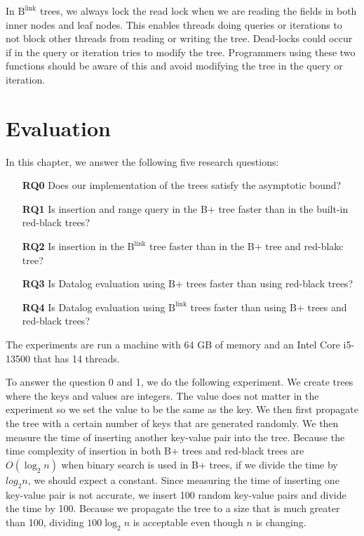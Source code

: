 \documentclass[twoside,11pt]{report}
\theoremstyle{definition}
\begin{document}
In $\text{B}^{\text{link}}$ trees, we always lock the read lock when we are reading the fields in both inner nodes and leaf nodes. This enables threads doing queries or iterations to not block other threads from reading or writing the tree. Dead-locks could occur if in the query or iteration tries to modify the tree. Programmers using these two functions should be aware of this and avoid modifying the tree in the query or iteration.


\chapter{Evaluation}
\label{ch:evaluation}

In this chapter, we answer the following five research questions:

\begin{itemize}
  \item[\textbf{RQ0}] Does our implementation of the trees satisfy the asymptotic bound?
  \item[\textbf{RQ1}] Is insertion and range query in the B+ tree faster than in the built-in red-black trees?
  \item[\textbf{RQ2}] Is insertion in the $\text{B}^{\text{link}}$ tree faster than in the B+ tree and red-blakc tree?
  \item[\textbf{RQ3}] Is Datalog evaluation using B+ trees faster than using red-black trees?
  \item[\textbf{RQ4}] Is Datalog evaluation using $\text{B}^{\text{link}}$ trees faster than using B+ trees and red-black trees?
\end{itemize}

The experiments are run a machine with 64 GB of memory and an Intel Core i5-13500 that has 14 threads.

To answer the question 0 and 1, we do the following experiment. We create trees where the keys and values are integers. The value does not matter in the experiment so we set the value to be the same as the key. We then first propagate the tree with a certain number of keys that are generated randomly. We then measure the time of inserting another key-value pair into the tree. Because the time complexity of insertion in both B+ trees and red-black trees are $O(\log_2 n)$ when binary search is used in B+ trees, if we divide the time by $log_2 n$, we should expect a constant. Since measuring the time of inserting one key-value pair is not accurate, we insert 100 random key-value pairs and divide the time by 100. Because we propagate the tree to a size that is much greater than 100, dividing $100 \log_2 n$ is acceptable even though $n$ is changing.
\end{document}
